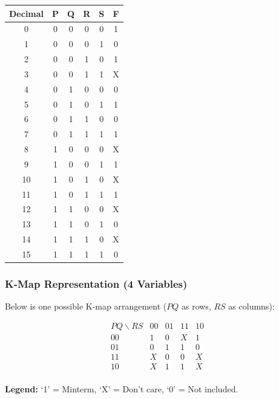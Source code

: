 \documentclass[12pt,a4paper]{article}
\begin{document}
\begin{center}
\begin{tabular}{|c|c|c|c|c|c|}
\hline
Decimal & P & Q & R & S & F \\
\hline
0  & 0 & 0 & 0 & 0 & 1   \\
1  & 0 & 0 & 0 & 1 & 0   \\
2  & 0 & 0 & 1 & 0 & 1   \\
3  & 0 & 0 & 1 & 1 & X   \\
4  & 0 & 1 & 0 & 0 & 0   \\
5  & 0 & 1 & 0 & 1 & 1   \\
6  & 0 & 1 & 1 & 0 & 0   \\
7  & 0 & 1 & 1 & 1 & 1   \\
8  & 1 & 0 & 0 & 0 & X   \\
9  & 1 & 0 & 0 & 1 & 1   \\
10 & 1 & 0 & 1 & 0 & X   \\
11 & 1 & 0 & 1 & 1 & 1   \\
12 & 1 & 1 & 0 & 0 & X   \\
13 & 1 & 1 & 0 & 1 & 0   \\
14 & 1 & 1 & 1 & 0 & X   \\
15 & 1 & 1 & 1 & 1 & 0   \\
\hline
\end{tabular}
\end{center}

\vspace{1ex}

\subsubsection*{K-Map Representation (4 Variables)}

Below is one possible K-map arrangement (\(PQ\) as rows, \(RS\) as columns):

\[
\begin{array}{c|cccc}
PQ\backslash RS & 00 & 01 & 11 & 10 \\
\hline
00 & 1  & 0 & X & 1 \\
01 & 0  & 1 & 1 & 0 \\
11 & X  & 0 & 0 & X \\
10 & X  & 1 & 1 & X \\
\end{array}
\]

\textbf{Legend:} ‘1’ = Minterm, ‘X’ = Don't care, ‘0’ = Not included.

\vspace{1ex}
\end{document}
